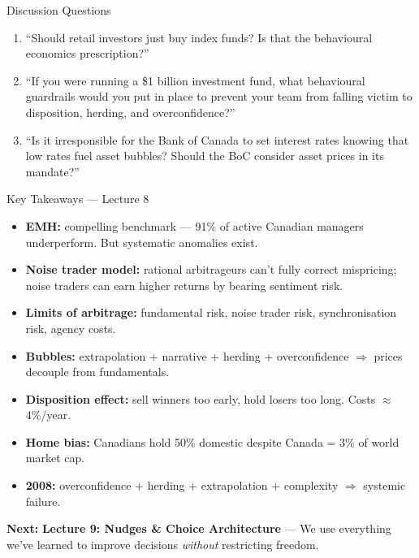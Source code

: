 \documentclass[aspectratio=169]{beamer}
\begin{document}
\begin{frame}{Discussion Questions}
\begin{enumerate}
  \item[\textcolor{bepurple}{Q1.}] ``Should retail investors just buy index funds? Is that the behavioural economics prescription?''
  \medskip
  \item[\textcolor{beteal}{Q2.}] ``If you were running a \$1 billion investment fund, what behavioural guardrails would you put in place to prevent your team from falling victim to disposition, herding, and overconfidence?''
  \medskip
  \item[\textcolor{berust}{Q3.}] ``Is it irresponsible for the Bank of Canada to set interest rates knowing that low rates fuel asset bubbles? Should the BoC consider asset prices in its mandate?''
\end{enumerate}
\end{frame}

\begin{frame}{Key Takeaways --- Lecture 8}
\begin{itemize}
  \item[\textcolor{beteal}{\checkmark}] \textbf{EMH:} compelling benchmark --- 91\% of active Canadian managers underperform. But systematic anomalies exist.
  \item[\textcolor{beteal}{\checkmark}] \textbf{Noise trader model:} rational arbitrageurs can't fully correct mispricing; noise traders can earn higher returns by bearing sentiment risk.
  \item[\textcolor{beteal}{\checkmark}] \textbf{Limits of arbitrage:} fundamental risk, noise trader risk, synchronisation risk, agency costs.
  \item[\textcolor{beteal}{\checkmark}] \textbf{Bubbles:} extrapolation + narrative + herding + overconfidence $\Rightarrow$ prices decouple from fundamentals.
  \item[\textcolor{beteal}{\checkmark}] \textbf{Disposition effect:} sell winners too early, hold losers too long. Costs $\approx$4\%/year.
  \item[\textcolor{beteal}{\checkmark}] \textbf{Home bias:} Canadians hold 50\% domestic despite Canada = 3\% of world market cap.
  \item[\textcolor{beteal}{\checkmark}] \textbf{2008:} overconfidence + herding + extrapolation + complexity $\Rightarrow$ systemic failure.
\end{itemize}
\medskip\textcolor{beblue}{\textbf{Next:}} \textbf{Lecture 9: Nudges \& Choice Architecture} --- We use everything we've learned to improve decisions \textit{without} restricting freedom.
\end{frame}
\end{document}
